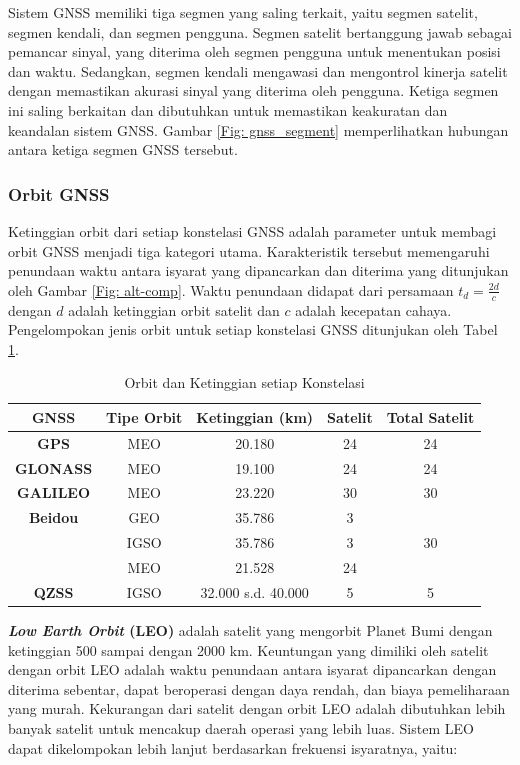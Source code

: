Sistem GNSS memiliki tiga segmen yang saling terkait, yaitu segmen satelit, segmen kendali, dan segmen pengguna. Segmen satelit bertanggung jawab sebagai pemancar sinyal, yang diterima oleh segmen pengguna untuk menentukan posisi dan waktu. Sedangkan, segmen kendali mengawasi dan mengontrol kinerja satelit dengan memastikan akurasi sinyal yang diterima oleh pengguna. Ketiga segmen ini saling berkaitan dan dibutuhkan untuk memastikan keakuratan dan keandalan sistem GNSS. Gambar \ref{Fig: gnss_segment} memperlihatkan hubungan antara ketiga segmen GNSS tersebut.

\subsubsection{Orbit GNSS}
Ketinggian orbit dari setiap konstelasi GNSS adalah parameter untuk membagi orbit GNSS menjadi tiga kategori utama. Karakteristik tersebut memengaruhi penundaan waktu antara isyarat yang dipancarkan dan diterima yang ditunjukan oleh Gambar \ref{Fig: alt-comp}. Waktu penundaan didapat dari persamaan $t_d = \frac{2d}{c}$ dengan $d$ adalah ketinggian orbit satelit dan $c$ adalah kecepatan cahaya. Pengelompokan jenis orbit untuk setiap konstelasi GNSS ditunjukan oleh Tabel \ref{Tab: gnss-orbit}.

\begin{table}[H]
	\caption{Orbit dan Ketinggian setiap Konstelasi \cite{Li2019} \cite{Bury2019}}
	\vspace{0.5em}
	\centering
	\begin{tabular}{ccccc}
		\hline
		\textbf{GNSS} &\textbf{Tipe Orbit} & \textbf{Ketinggian (km)} & \textbf{Satelit} & \textbf{Total Satelit}\\
		\hline 
		\textbf{GPS} & MEO & 20.180 & 24 & 24\\
		\textbf{GLONASS} & MEO & 19.100 & 24 & 24\\
		\textbf{GALILEO} & MEO & 23.220 & 30 & 30\\
		\textbf{Beidou} & GEO & 35.786 & 3\\
		& IGSO & 35.786 & 3 & 30\\
		& MEO& 21.528 & 24\\
		\textbf{QZSS} & IGSO &32.000 s.d. 40.000 & 5 & 5\\
		\hline
	\end{tabular}
	\label{Tab: gnss-orbit}
\end{table}

\textbf{\textit{Low Earth Orbit} (LEO)} adalah satelit yang mengorbit Planet Bumi dengan ketinggian 500 sampai dengan 2000 km. Keuntungan yang dimiliki oleh satelit dengan orbit LEO adalah waktu penundaan antara isyarat dipancarkan dengan diterima sebentar, dapat beroperasi dengan daya rendah, dan biaya pemeliharaan yang murah. Kekurangan dari satelit dengan orbit LEO adalah dibutuhkan lebih banyak satelit untuk mencakup daerah operasi yang lebih luas. Sistem LEO dapat dikelompokan lebih lanjut berdasarkan frekuensi isyaratnya, yaitu:

